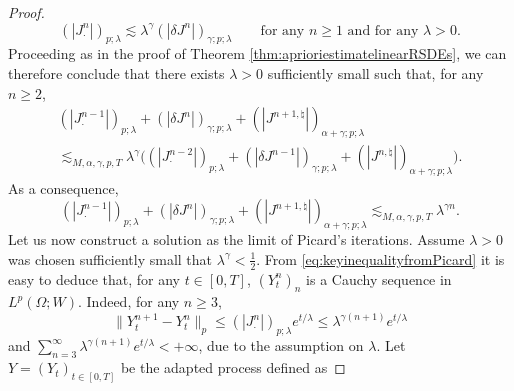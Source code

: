 \documentclass[11pt,a4paper]{article}
\theoremstyle{plain}
\begin{document}
\begin{proof}
\begin{equation*}
        (|J^n_\cdot|)_{p;\lambda} \lesssim \lambda^\gamma (|\delta{J}^n|)_{\gamma;p;\lambda} \qquad \text{for any $n \ge 1$ and for any $\lambda>0$.}
    \end{equation*} 
    Proceeding as in the proof of Theorem \ref{thm:aprioriestimatelinearRSDEs}, we can therefore conclude that there exists $\lambda>0$ sufficiently small such that, for any $n \ge 2$,   
    \begin{multline*}  
        (|J^{n-1}_\cdot|)_{p;\lambda} + (|\delta J^n|)_{\gamma;p;\lambda} + (|J^{n+1,\natural}|)_{\alpha+\gamma;p;\lambda}  \\ \lesssim_{M,\alpha,\gamma,p,T} \lambda^\gamma \big((|J^{n-2}_\cdot|)_{p;\lambda} + (|\delta J^{n-1}|)_{\gamma;p;\lambda} + (|J^{n,\natural}|)_{\alpha+\gamma;p;\lambda}\big).  
    \end{multline*} 
    As a consequence, 
    \begin{equation} \label{eq:keyinequalityfromPicard}
        (|J^{n-1}_\cdot|)_{p;\lambda} + (|\delta J^n|)_{\gamma;p;\lambda} + (|J^{n+1,\natural}|)_{\alpha+\gamma;p;\lambda} \lesssim_{M,\alpha,\gamma,p,T} \lambda^{\gamma n}.
    \end{equation}
    Let us now construct a solution as the limit of Picard's iterations.
    Assume $\lambda >0$ was chosen sufficiently small that $\lambda^{\gamma} < \frac{1}{2}$.
    From \eqref{eq:keyinequalityfromPicard} it is easy to deduce that, for any $t \in [0,T]$, $(Y^n_t)_n$ is a Cauchy sequence in $L^p(\Omega;W)$. Indeed, for any $n \ge 3$, \begin{equation*}
        \|Y^{n+1}_t - Y^n_t\|_p \le (| J^n_\cdot |)_{p;\lambda} e^{t/\lambda} \le \lambda^{\gamma(n+1)} e^{t/\lambda} 
    \end{equation*}
    and $\sum_{n=3}^\infty \lambda^{\gamma(n+1)} e^{t/\lambda} <+\infty$, due to the assumption on $\lambda$. 
    Let $Y=(Y_t)_{t \in [0,T]}$ be the adapted process defined as
    

\end{proof}
\end{document}
